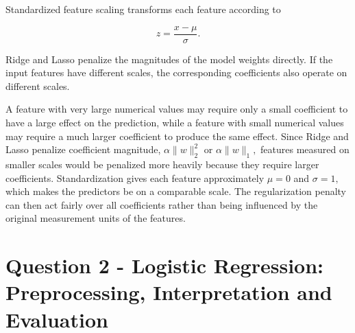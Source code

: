 \documentclass[11pt]{article}
\begin{document}
Standardized feature scaling transforms each feature according to

\[
z=\frac{x-\mu}{\sigma}.
\]

Ridge and Lasso penalize the magnitudes of the model weights directly.
If the input features have different scales, the corresponding
coefficients also operate on different scales.

A feature with very large numerical values may require only a small
coefficient to have a large effect on the prediction, while a feature
with small numerical values may require a much larger coefficient to
produce the same effect. Since Ridge and Lasso penalize coefficient
magnitude, \(\alpha\lVert w\rVert_2^2\) or \(\alpha\lVert w\rVert_1,\)
features measured on smaller scales would be penalized more heavily
because they require larger coefficients. Standardization gives each
feature approximately \(\mu=0\) and \(\sigma=1,\) which makes the
predictors be on a comparable scale. The regularization penalty can then
act fairly over all coefficients rather than being influenced by the
original measurement units of the features.

    \clearpage
    \section{Question 2 - Logistic Regression: Preprocessing, Interpretation
and
Evaluation}\label{question-2---logistic-regression-preprocessing-interpretation-and-evaluation}
\end{document}
